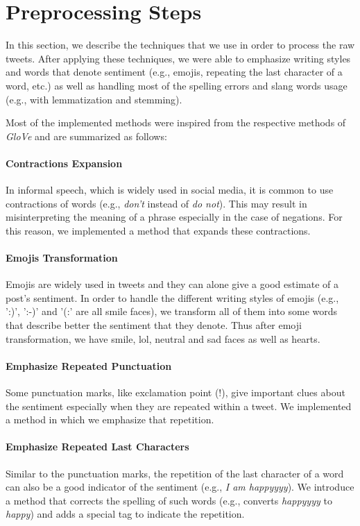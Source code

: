 \section{Preprocessing Steps}
\label{sec:preprocessing}
In this section, we describe the techniques that we use in order to process the raw tweets.
After applying these techniques, we were able to emphasize writing styles and words that denote sentiment (e.g., emojis, repeating the last character of a word, etc.)
as well as handling most of the spelling errors and slang words usage (e.g., with lemmatization and stemming).

Most of the implemented methods were inspired from the respective methods of \textit{GloVe} \cite{pennington2014glove} and are summarized as follows:

\noindent
\paragraph{\textbf{Contractions Expansion}}
{\setlength{\parindent}{0cm}
In informal speech, which is widely used in social media, it is common to use contractions of words (e.g., \textit{don't} instead of \textit{do not}).
This may result in misinterpreting the meaning of a phrase especially in the case of negations.
For this reason, we implemented a method that expands these contractions.}

\paragraph{\textbf{Emojis Transformation}}
{\setlength{\parindent}{0cm}
Emojis are widely used in tweets and they can alone give a good estimate of a post's sentiment.
In order to handle the different writing styles of emojis (e.g., ':)', ':-)' and '(:' are all smile faces), we transform all of them into some words that describe better the sentiment that they denote.
Thus after emoji transformation, we have smile, lol, neutral and sad faces as well as hearts.}

\paragraph{\textbf{Emphasize Repeated Punctuation}}
{\setlength{\parindent}{0cm}
Some punctuation marks, like exclamation point (!), give important clues about the sentiment especially when they are repeated within a tweet. 
We implemented a method in which we emphasize that repetition.}

\paragraph{\textbf{Emphasize Repeated Last Characters}}
{\setlength{\parindent}{0cm}
Similar to the punctuation marks, the repetition of the last character of a word can also be a good indicator of the sentiment (e.g., \textit{I am happyyyy}). We introduce a method that corrects the spelling of such words (e.g., converts \textit{happyyyy} to \textit{happy}) and adds a special tag to indicate the repetition.}

